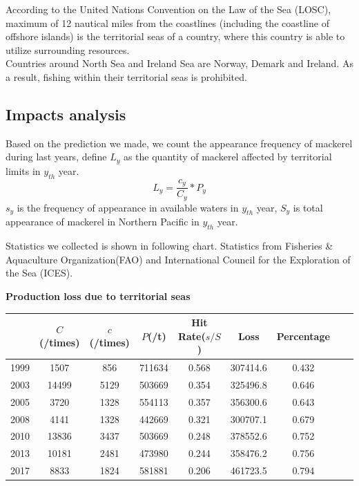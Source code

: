\documentclass{mcmthesis}
\begin{document}
According to the United Nations Convention on the Law of the Sea (LOSC), maximum of 12 nautical miles from the coastlines (including the coastline of offshore islands) is the territorial seas of a country, where this country is able to utilize surrounding resources. \\
Countries around North Sea and Ireland Sea are Norway, Demark and Ireland. As a result, fishing within their territorial seas is prohibited.

\subsection{Impacts analysis}
Based on the prediction we made, we count the appearance frequency of mackerel during last years, define $L_{y}$ as the quantity of mackerel affected by territorial limits in $y_{th}$ year.
\begin{equation}L_{y} = \frac{c_{y}}{C_{y}}*P_{y}\end{equation}
$s_{y}$ is the  frequency of appearance in available waters in $y_{th}$ year, $S_{y}$ is total appearance of mackerel in Northern Pacific in $y_{th}$ year.

Statistics we collected is shown in following chart. Statistics from Fisheries \& Aquaculture Organization(FAO) and
International Council for the Exploration of the Sea (ICES).

\textbf{Production loss due to territorial seas}
\begin{center}
\begin{tabular}{|c|c|c|c|c|c|c|c|c|}
\hline

\rowcolor{lightgray}{Year}&{$C$(/times)} & {$c$(/times)}& {$P$(/t)}& {Hit Rate(${s/S}$)}& {Loss}
& {Percentage}  \\ \hline
1999    &1507	&856	&711634	&0.568   &307414.6   &0.432\\ \hline 
2003	&14499	&5129	&503669	&0.354  &325496.8	 &0.646\\ \hline 
2005	&3720	&1328	&554113	&0.357	&356300.6	&0.643\\ \hline 
2008	&4141	&1328	&442669	&0.321    &300707.1	&0.679\\ \hline 
2010	&13836	&3437	&503669	&0.248	&378552.6	&0.752\\ \hline 
2013	&10181	&2481	&473980	&0.244	&358476.2	&0.756\\ \hline 
2017	&8833	&1824	&581881	&0.206	&461723.5	&0.794\\ \hline 
\end{tabular}\\
\end{center}
\end{document}
